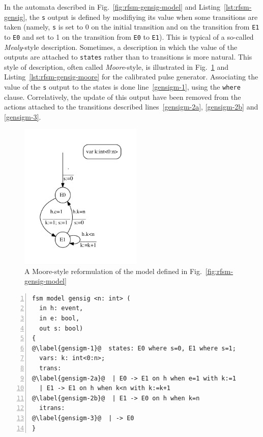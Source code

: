 In the automata described in Fig.~\ref{fig:rfsm-gensig-model} and Listing~\ref{lst:rfsm-gensig}, the
\texttt{s} output is defined by modifiying its value when some transitions are taken (namely,
\texttt{s} is set to 0 on the initial transition and on the transition from \texttt{E1} to
\texttt{E0} and set to 1 on the transition from \texttt{E0} to \texttt{E1}). This is typical of a
so-called \emph{Mealy}-style description. Sometimes, a description in which the value of the outputs
are attached to \texttt{states} rather than to transitions is more natural. This style of
description, often called \emph{Moore}-style, is illustrated in Fig.~\ref{fig:rfsm-gensig-moore} and
Listing~\ref{lst:rfsm-gensig-moore} for the calibrated pulse generator. Associating the value of the
\texttt{s} output to the states is done line~\ref{gensigm-1}, using the \texttt{where}
clause. Correlatively, the update of this output have been removed from the actions attached to the
transitions described lines~\ref{gensigm-2a}, \ref{gensigm-2b} and \ref{gensigm-3}.

\begin{figure}[!h]
   \includegraphics[height=7cm]{figs/gensig-model}
   \centering
  \caption{A Moore-style reformulation of the model defined in Fig.~\ref{fig:rfsm-gensig-model}}
  \label{fig:rfsm-gensig-moore}
\end{figure}


\begin{lstlisting}[language=Rfsm,frame=single,numbers=left,caption=Transcription in RFSM of the
  model given in Fig.~\ref{fig:rfsm-gensig-moore},label={lst:rfsm-gensig-moore},float]
fsm model gensig <n: int> (
  in h: event,
  in e: bool,
  out s: bool)
{
@\label{gensigm-1}@  states: E0 where s=0, E1 where s=1;
  vars: k: int<0:n>;
  trans:
@\label{gensigm-2a}@  | E0 -> E1 on h when e=1 with k:=1
  | E1 -> E1 on h when k<n with k:=k+1
@\label{gensigm-2b}@  | E1 -> E0 on h when k=n
  itrans:
@\label{gensigm-3}@  | -> E0
}
\end{lstlisting}

